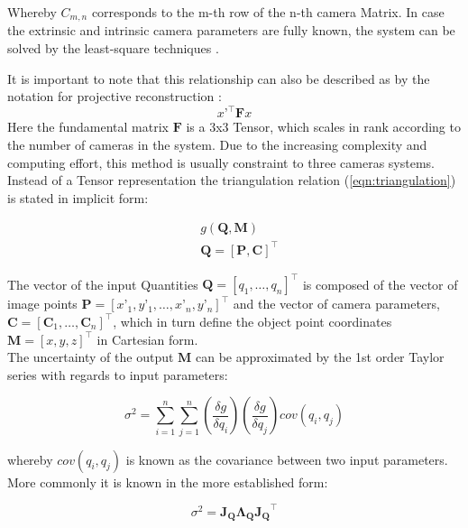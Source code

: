 \documentclass[5p,times,procedia]{elsarticle}
\begin{document}
Whereby $C_{m,n}$ corresponds to the m-th row of the n-th camera Matrix.
In case the extrinsic and intrinsic camera parameters are fully known, the system can be solved by the least-square techniques \cite{Ahn2004}.

It is important to note that this relationship can also be described as by the notation for projective reconstruction \cite{Hartley2018}:
\begin{equation}
	\label{eqn:ProjectiveReconstruction}
	x’^{\top}\mathbf{F}x
\end{equation}
Here the fundamental matrix $\mathbf{F}$ is a 3x3 Tensor, which scales in rank according to the number of cameras in the system. Due to the increasing complexity and computing effort, this method is usually constraint to three cameras systems.\\
Instead of a Tensor representation the triangulation relation (\ref{eqn:triangulation}) is stated in implicit form:

\begin{equation}
	\label{eqn:ImplicitFrom}
	\begin{aligned}
		& g(\mathbf{Q},\mathbf{M}) \\
		& \mathbf{Q} = [\mathbf{P},\mathbf{C}]^{\top}
	\end{aligned}
\end{equation}

The vector of the input Quantities $\mathbf{Q} = \left[q_1,\dots, q_{n}\right]^{\top}$ is composed of the vector of image points $\mathbf{P} = [x’_1,y’_1, \dots ,x’_n,y’_n]^{\top}$ and the vector of camera parameters, $\mathbf{C} = \left[ \mathbf{C}_1 , \dots , \mathbf{C}_n \right]^{\top}$, which in turn define the object point coordinates $\mathbf{M} =  [x,y,z]^{\top}$ in Cartesian form. \\
The uncertainty of the output $\mathbf{M}$ can be approximated by the 1st order Taylor series with regards to input parameters:

\begin{equation}
	\sigma^2 = \sum_{i=1}^{n}\sum_{j=1}^{n} \left(\frac{\delta g}{\delta q_i}\right) \left(\frac{\delta g}{\delta q_j}\right) cov(q_i, q_j) 
\end{equation}

whereby $cov(q_i, q_j) $ is known as the covariance between two input parameters. More commonly it is known in the more established \cite{Cox2006} form: 

\begin{equation}
	\sigma^2 = \mathbf{J_{Q}}\mathbf{\Lambda_{Q}}\mathbf{J_{Q}}^{\top}
\end{equation}
\end{document}
